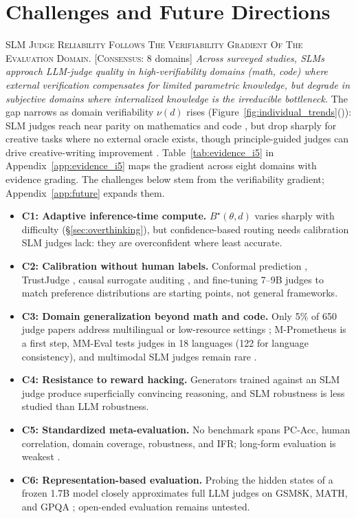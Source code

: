 \documentclass[11pt]{article}
\begin{document}
\section{Challenges and Future Directions}
\label{sec:challenges}

\textsc{SLM Judge Reliability Follows The Verifiability Gradient Of The Evaluation Domain.} [\textsc{Consensus}: 8 domains] \textit{Across surveyed studies, SLMs approach LLM-judge quality in high-verifiability domains (math, code) where external verification compensates for limited parametric knowledge, but degrade in subjective domains where internalized knowledge is the irreducible bottleneck.} The gap narrows as domain verifiability $\nu(d)$ rises (Figure~\ref{fig:individual_trends}()): SLM judges reach near parity on mathematics \citep{bi2026judgeboard, chen2025judgelrm} and code \citep{jiang2025codejudgebench}, but drop sharply for creative tasks where no external oracle exists, though principle-guided judges can drive creative-writing improvement \citep{wei2025igniting}. Table~\ref{tab:evidence_i5} in Appendix~\ref{app:evidence_i5} maps the gradient across eight domains with evidence grading. The challenges below stem from the verifiability gradient; Appendix~\ref{app:future} expands them.

\begin{itemize}[leftmargin=1.35em, itemsep=1.5pt, topsep=2pt, parsep=0pt]
\item \textbf{C1: Adaptive inference-time compute.} $B^\star(\theta,d)$ varies sharply with difficulty (\S\ref{sec:overthinking}), but confidence-based routing \citep{jung2025trust} needs calibration SLM judges lack: they are overconfident where least accurate.
\item \textbf{C2: Calibration without human labels.} Conformal prediction \citep{sheng2025analyzing}, TrustJudge \citep{wang2025trustjudge}, causal surrogate auditing \citep{landesberg2025causal}, and fine-tuning 7--9B judges to match preference distributions \citep{li2025judging} are starting points, not general frameworks.
\item \textbf{C3: Domain generalization beyond math and code.} Only 5\% of 650 judge papers address multilingual or low-resource settings \citep{dougruoz2026challenges}; M-Prometheus \citep{pombal2025m} is a first step, MM-Eval \citep{son2024mm} tests judges in 18 languages (122 for language consistency), and multimodal SLM judges remain rare \citep{lee2024fleur}.
\item \textbf{C4: Resistance to reward hacking.} Generators trained against an SLM judge produce superficially convincing reasoning, and SLM robustness is less studied than LLM robustness.
\item \textbf{C5: Standardized meta-evaluation.} No benchmark spans PC-Acc, human correlation, domain coverage, robustness, and IFR; long-form evaluation is weakest \citep{chen2026benchmarking}.
\item \textbf{C6: Representation-based evaluation.} Probing the hidden states of a frozen 1.7B model closely approximates full LLM judges on GSM8K, MATH, and GPQA \citep{li2026rethinking}; open-ended evaluation remains untested.
\end{itemize}
\end{document}
